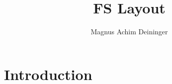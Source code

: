 \documentclass[a4paper,twoside,titlepage]{article}
\title{FS Layout}
\author{Magnus Achim Deininger}
\begin{document}
\maketitle
\section{Introduction}
\end{document}
